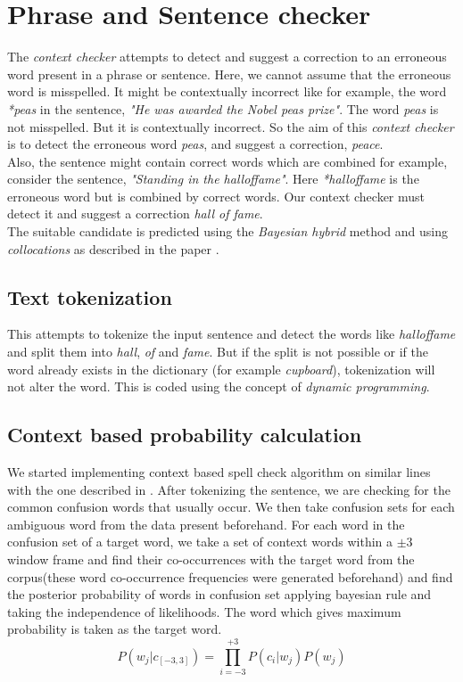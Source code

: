 \documentclass{article}
\begin{document}
	\section{Phrase and Sentence checker}
		The \textit{context checker} attempts to detect and suggest a correction to an erroneous word present in a phrase or sentence. Here, we cannot assume that the erroneous word is misspelled. It might be contextually incorrect like for example, the word \textit{*peas} in the sentence, \textit{"He was awarded the Nobel peas prize"}. The word \textit{peas} is not misspelled. But it is contextually incorrect. So the aim of this \textit{context checker} is to detect the erroneous word \textit{peas}, and suggest a correction, \textit{peace}.\\
		Also, the sentence might contain correct words which are combined for example, consider the sentence, \textit{"Standing in the halloffame"}. Here \textit{*halloffame} is the erroneous word but is combined by correct words. Our context checker must detect it and suggest a correction \textit{hall of fame}.\\
		The suitable candidate is predicted using the \textit{Bayesian hybrid} method and using \textit{collocations} as described in the paper \cite{bayesian_hybrid}.\\
		\subsection{Text tokenization}
			This attempts to tokenize the input sentence and detect the words like \textit{halloffame} and split them into \textit{hall}, \textit{of} and \textit{fame}. But if the split is not possible or if the word already exists in the dictionary (for example \textit{cupboard}), tokenization will not alter the word. This is coded using the concept of \textit{dynamic programming}.
		\subsection{Context based probability calculation}
			We started implementing context based spell check algorithm on similar lines with the one described in \cite{bayesian_hybrid}. After tokenizing the sentence, we are checking for the common confusion words that usually occur. We then take confusion sets for each ambiguous word from the data present beforehand. For each word in the confusion set of a target word, we take a set of context words within a $\pm3$ window frame and find their co-occurrences with the target word from the corpus(these word co-occurrence frequencies were generated beforehand) and find the posterior probability of words in confusion set applying bayesian rule and taking the independence of likelihoods. The word which gives maximum probability is taken as the target word.
			\begin{equation*}
				P(w_{j}|c_{[-3,3]})=\underset{i=-3}{\overset{+3}{\prod}}P(c_{i}|w_{j})P(w_{j})
			\end{equation*}
\end{document}
